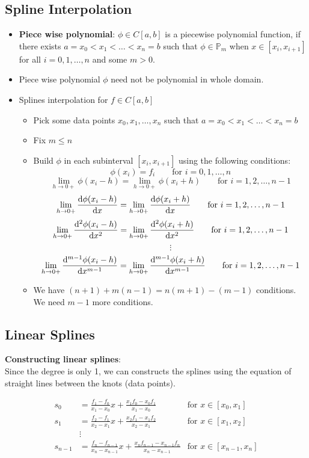\documentclass{article}
\begin{document}
\subsection{Spline Interpolation}
\label{spline}
\begin{itemize}
	\item \textbf{Piece wise polynomial}: $\phi \in C[a,b]$ is a piecewise polynomial function, if there exists $a=x_0<x_1<\hdots<x_n=b$ such that $\phi \in \mathbb{P}_m$ when $x \in [x_i,x_{i+1}]$ for all $i=0,1,\hdots,n$ and some $m>0$.


	\item Piece wise polynomial $\phi$ need not be polynomial in whole domain.

	\item Splines interpolation for $f \in C[a,b]$
	\begin{itemize}
		\item Pick some data points $x_0,x_1,\hdots,x_n$ such that $a=x_0<x_1<\hdots<x_n=b$
		\item Fix $m\leq n$
		\item Build $\phi$ in each subinterval $[x_i,x_{i+1}]$ using the following conditions:
			\[\phi(x_i)= f_i \qquad \text{for } i=0,1,\hdots,n\]
			\[\lim_{h\rightarrow 0+} \phi(x_i-h) = \lim_{h\rightarrow 0+} \phi(x_i+h) \qquad \text{for } i=1,2,\hdots,n-1\]
			\[\lim_{h\rightarrow 0+} \dv{\phi(x_i-h)}{x} = \lim_{h\rightarrow 0+} \dv{\phi(x_i+h)}{x} \qquad \text{for } i=1,2,\hdots,n-1\]
			\[\lim_{h\rightarrow 0+} \dv[2]{\phi(x_i-h)}{x} = \lim_{h\rightarrow 0+} \dv[2]{\phi(x_i+h)}{x} \qquad \text{for } i=1,2,\hdots,n-1\]
			\[\vdots\]
			\[\lim_{h\rightarrow 0+} \dv[m-1]{\phi(x_i-h)}{x} = \lim_{h\rightarrow 0+} \dv[m-1]{\phi(x_i+h)}{x} \qquad \text{for } i=1,2,\hdots,n-1\]
		\item We have $(n+1)+m(n-1)=n(m+1)-(m-1)$ conditions. We need $m-1$ more conditions.
	\end{itemize}

\end{itemize}


\subsection{Linear Splines}

	\textbf{Constructing linear splines}:\\
	Since the degree is only 1, we can constructs the splines using the equation of straight lines between the knots (data points).

	\begin{align*}
		s_0 &= \frac{f_1 - f_0}{x_1 - x_0}x + \frac{x_1 f_0 - x_0f_1}{x_1-x_0}		&\text{for } x\in [x_0,x_1]\\	
		s_1 &= \frac{f_2 - f_1}{x_2 - x_1}x + \frac{x_2 f_1 - x_1f_2}{x_2-x_1}		&\text{for } x\in [x_1,x_2]\\	
		&\vdots\\
		s_{n-1} &= \frac{f_n - f_{n-1}}{x_n - x_{n-1}}x + \frac{x_n f_{n-1} - x_{n-1}f_n}{x_n-x_{n-1}}		&\text{for } x\in [x_{n-1},x_n]\\	
	\end{align*}
\end{document}
